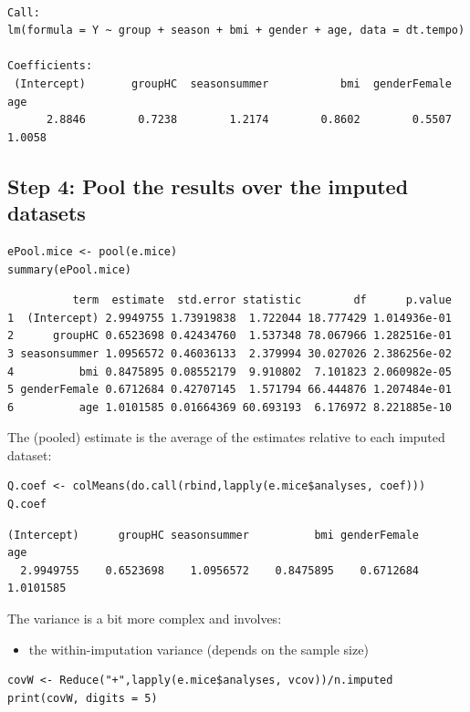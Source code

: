 \documentclass[12pt]{article}
\begin{document}
\begin{verbatim}

Call:
lm(formula = Y ~ group + season + bmi + gender + age, data = dt.tempo)

Coefficients:
 (Intercept)       groupHC  seasonsummer           bmi  genderFemale           age  
      2.8846        0.7238        1.2174        0.8602        0.5507        1.0058
\end{verbatim}

\clearpage

\subsection{Step 4: Pool the results over the imputed datasets}
\label{sec:org4f3576a}

\lstset{language=r,label= ,caption= ,captionpos=b,numbers=none}
\begin{lstlisting}
ePool.mice <- pool(e.mice)
summary(ePool.mice)
\end{lstlisting}

\begin{verbatim}
          term  estimate  std.error statistic        df      p.value
1  (Intercept) 2.9949755 1.73919838  1.722044 18.777429 1.014936e-01
2      groupHC 0.6523698 0.42434760  1.537348 78.067966 1.282516e-01
3 seasonsummer 1.0956572 0.46036133  2.379994 30.027026 2.386256e-02
4          bmi 0.8475895 0.08552179  9.910802  7.101823 2.060982e-05
5 genderFemale 0.6712684 0.42707145  1.571794 66.444876 1.207484e-01
6          age 1.0101585 0.01664369 60.693193  6.176972 8.221885e-10
\end{verbatim}


The (pooled) estimate is the average of the estimates relative to each
imputed dataset:
\lstset{language=r,label= ,caption= ,captionpos=b,numbers=none}
\begin{lstlisting}
Q.coef <- colMeans(do.call(rbind,lapply(e.mice$analyses, coef)))
Q.coef
\end{lstlisting}

\begin{verbatim}
(Intercept)      groupHC seasonsummer          bmi genderFemale          age 
  2.9949755    0.6523698    1.0956572    0.8475895    0.6712684    1.0101585
\end{verbatim}

The variance is a bit more complex and involves:
\begin{itemize}
\item the within-imputation variance (depends on the sample size)
\end{itemize}
\lstset{language=r,label= ,caption= ,captionpos=b,numbers=none}
\begin{lstlisting}
covW <- Reduce("+",lapply(e.mice$analyses, vcov))/n.imputed
print(covW, digits = 5)
\end{lstlisting}
\end{document}
